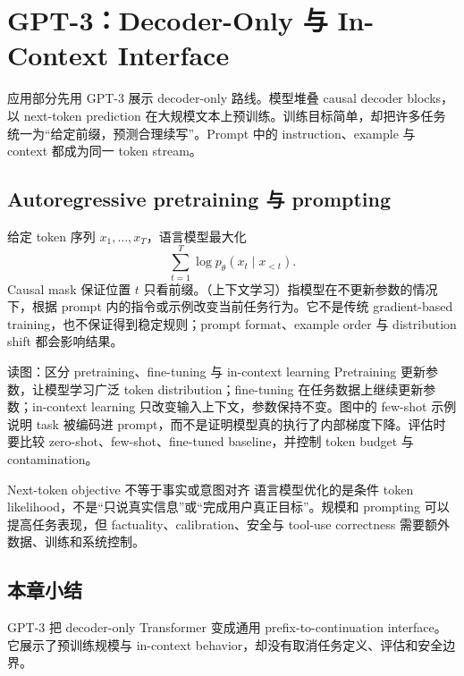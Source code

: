 \section{GPT-3：Decoder-Only 与 In-Context Interface}

应用部分先用 GPT-3 展示 decoder-only 路线。模型堆叠 causal decoder blocks，以 next-token prediction 在大规模文本上预训练。训练目标简单，却把许多任务统一为“给定前缀，预测合理续写”。Prompt 中的 instruction、example 与 context 都成为同一 token stream。

\subsection{Autoregressive pretraining 与 prompting}

给定 token 序列 $x_1,\ldots,x_T$，语言模型最大化
\[
\sum_{t=1}^{T}\log p_\theta(x_t\mid x_{<t}).
\]
Causal mask 保证位置 $t$ 只看前缀。（上下文学习）指模型在不更新参数的情况下，根据 prompt 内的指令或示例改变当前任务行为。它不是传统 gradient-based training，也不保证得到稳定规则；prompt format、example order 与 distribution shift 都会影响结果。


\begin{knowledgebox}{读图：区分 pretraining、fine-tuning 与 in-context learning}
Pretraining 更新参数，让模型学习广泛 token distribution；fine-tuning 在任务数据上继续更新参数；in-context learning 只改变输入上下文，参数保持不变。图中的 few-shot 示例说明 task 被编码进 prompt，而不是证明模型真的执行了内部梯度下降。评估时要比较 zero-shot、few-shot、fine-tuned baseline，并控制 token budget 与 contamination。
\end{knowledgebox}


\begin{warningbox}{Next-token objective 不等于事实或意图对齐}
语言模型优化的是条件 token likelihood，不是“只说真实信息”或“完成用户真正目标”。规模和 prompting 可以提高任务表现，但 factuality、calibration、安全与 tool-use correctness 需要额外数据、训练和系统控制。
\end{warningbox}

\subsection{本章小结}

GPT-3 把 decoder-only Transformer 变成通用 prefix-to-continuation interface。它展示了预训练规模与 in-context behavior，却没有取消任务定义、评估和安全边界。


